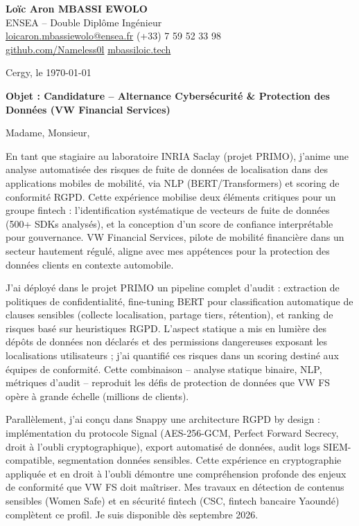 \documentclass[a4paper,11pt]{article}
\begin{document}
\noindent \textbf{Lo\"ic Aron MBASSI EWOLO} \\
ENSEA -- Double Dipl\^ome Ing\'enieur \\
\href{mailto:loicaron.mbassiewolo@ensea.fr}{loicaron.mbassiewolo@ensea.fr} \quad (+33) 7 59 52 33 98 \\
\href{https://github.com/Nameless0l}{github.com/Nameless0l} \quad \href{https://mbassiloic.tech}{mbassiloic.tech}

\vspace{1em}
\noindent Cergy, le \today

\vspace{1em}
\noindent \textbf{Objet : Candidature -- Alternance Cybersécurité \& Protection des Donn\'ees (VW Financial Services)}

\vspace{1.5em}
\noindent Madame, Monsieur,

\vspace{0.8em}
\noindent En tant que stagiaire au laboratoire INRIA Saclay (projet PRIMO), j'anime une analyse automatisée des risques de fuite de donn\'ees de localisation dans des applications mobiles de mobilité, via NLP (BERT/Transformers) et scoring de conformité RGPD. Cette expérience mobilise deux éléments critiques pour un groupe fintech : l'identification systématique de vecteurs de fuite de données (500+ SDKs analysés), et la conception d'un score de confiance interprétable pour gouvernance. VW Financial Services, pilote de mobilité financière dans un secteur hautement régulé, aligne avec mes appétences pour la protection des données clients en contexte automobile.

\vspace{0.8em}
\noindent J'ai déployé dans le projet PRIMO un pipeline complet d'audit : extraction de politiques de confidentialité, fine-tuning BERT pour classification automatique de clauses sensibles (collecte localisation, partage tiers, rétention), et ranking de risques basé sur heuristiques RGPD. L'aspect statique a mis en lumière des dépôts de données non déclarés et des permissions dangereuses exposant les localisations utilisateurs ; j'ai quantifié ces risques dans un scoring destiné aux équipes de conformité. Cette combinaison -- analyse statique binaire, NLP, métriques d'audit -- reproduit les défis de protection de données que VW FS opère à grande échelle (millions de clients).

\vspace{0.8em}
\noindent Parallèlement, j'ai conçu dans Snappy une architecture RGPD by design : implémentation du protocole Signal (AES-256-GCM, Perfect Forward Secrecy, droit à l'oubli cryptographique), export automatisé de données, audit logs SIEM-compatible, segmentation données sensibles. Cette expérience en cryptographie appliquée et en droit à l'oubli démontre une compréhension profonde des enjeux de conformité que VW FS doit maîtriser. Mes travaux en détection de contenus sensibles (Women Safe) et en sécurité fintech (CSC, fintech bancaire Yaoundé) complètent ce profil. Je suis disponible dès septembre 2026.
\end{document}

